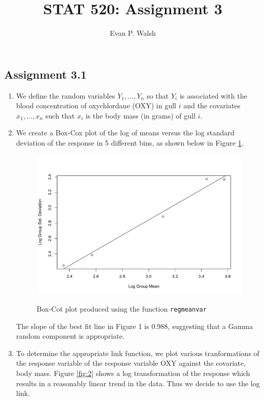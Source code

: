 \documentclass[12pt]{article}
\title{STAT 520: Assignment 3}
\author{Evan P. Walsh}
\begin{document}
\maketitle


\subsection*{Assignment 3.1}

\begin{enumerate}
  \item We define the random variables $Y_{1}, \dots, Y_{n}$ so that $Y_i$ is associated with the blood concentration of oxychlordane (OXY) in gull
    $i$ and the covariates $x_{1}, \dots, x_{n}$ such that $x_{i}$ is the body mass (in grams) of gull $i$.

  \item We create a Box-Cox plot of the log of means 
    versus the log standard deviation of the response in 5 different bins, as shown below in Figure \ref{fig:1}.

    \begin{figure}[h]
      \caption{Box-Cot plot produced using the function \texttt{regmeanvar}}
      \centering
      \includegraphics[width=.8\textwidth]{./figures/hw03_regmeanvar.pdf}
      \label{fig:1}
    \end{figure}

    The slope of the best fit line in Figure 1 is 0.988, suggesting that a Gamma random component is appropriate.

  \item To determine the appropriate link function, we plot various tranformations of the response variable of the response variable OXY against the covariate, body mass.
    Figure \ref{fig:2} shows a log transformation of the response which results in a reasonably linear trend in the data. Thus we decide to use the
    log link.
    

\end{enumerate}
\end{document}
